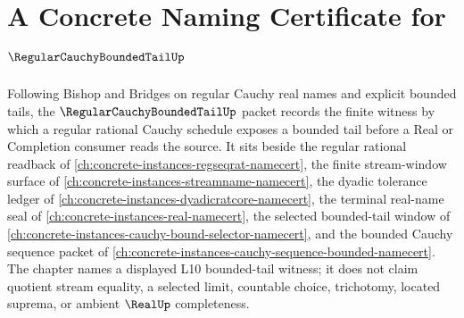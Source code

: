 \chapter{A Concrete Naming Certificate for $\RegularCauchyBoundedTailUp$}
\label{ch:concrete-instances-regular-cauchy-bounded-tail-namecert}

Following Bishop and Bridges on regular Cauchy real names and explicit bounded tails, the $\RegularCauchyBoundedTailUp$ packet records the finite witness by which a regular rational Cauchy schedule exposes a bounded tail before a Real or Completion consumer reads the source. It sits beside the regular rational readback of \autoref{ch:concrete-instances-regseqrat-namecert}, the finite stream-window surface of \autoref{ch:concrete-instances-streamname-namecert}, the dyadic tolerance ledger of \autoref{ch:concrete-instances-dyadicratcore-namecert}, the terminal real-name seal of \autoref{ch:concrete-instances-real-namecert}, the selected bounded-tail window of \autoref{ch:concrete-instances-cauchy-bound-selector-namecert}, and the bounded Cauchy sequence packet of \autoref{ch:concrete-instances-cauchy-sequence-bounded-namecert}. The chapter names a displayed L10 bounded-tail witness; it does not claim quotient stream equality, a selected limit, countable choice, trichotomy, located suprema, or ambient $\RealUp$ completeness.

